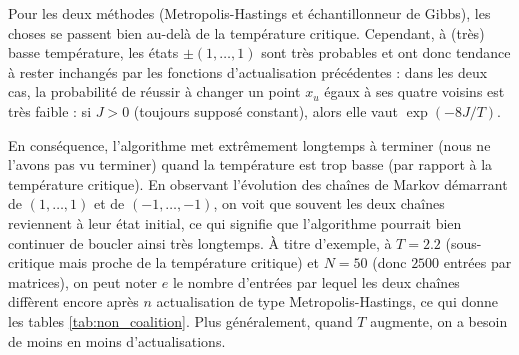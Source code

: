 \documentclass[a4paper,11pt]{article}
\begin{document}
Pour les deux méthodes (Metropolis-Hastings et échantillonneur de Gibbs), les choses se passent bien au-delà de la température critique. Cependant, à (très) basse température, les états $\pm(1,\hdots,1)$ sont très probables et ont donc tendance à rester inchangés par les fonctions d'actualisation précédentes : dans les deux cas, la probabilité de réussir à changer un point $x_u$ égaux à ses quatre voisins est très faible : si $J>0$ (toujours supposé constant), alors elle vaut $\exp(-8 J/T)$.

En conséquence, l'algorithme met extrêmement longtemps à terminer (nous ne l'avons pas vu terminer) quand la température est trop basse (par rapport à la température critique). En observant l'évolution des chaînes de Markov démarrant de $(1,\hdots,1)$ et de $(-1,\hdots,-1)$, on voit que souvent les deux chaînes reviennent à leur état initial, ce qui signifie que l'algorithme pourrait bien continuer de boucler ainsi très longtemps. À titre d'exemple, à $T = 2.2$ (sous-critique mais proche de la température critique) et $N = 50$ (donc $2500$ entrées par matrices), on peut noter $e$ le nombre d'entrées par lequel les deux chaînes diffèrent encore après $n$ actualisation de type Metropolis-Hastings, ce qui donne les tables \ref{tab:non_coalition}. Plus généralement, quand $T$ augmente, on a besoin de moins en moins d'actualisations.
\end{document}
